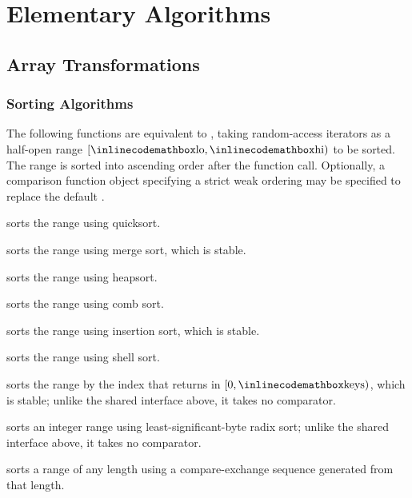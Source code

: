\chapter{\texorpdfstring{Elementary Algorithms}{1. Elementary Algorithms}}

\section{\texorpdfstring{Array Transformations}{1.1 Array Transformations}}
\setcounter{section}{1}
\setcounter{subsection}{0}
\subsection{Sorting Algorithms}
\label{sec:1.1.1}
The following functions are equivalent to , taking random-access iterators as a half-open range $[{\inlinecodemath{lo}}, {\inlinecodemath{hi}})$ to be sorted. The range is sorted into ascending order after the function call. Optionally, a comparison function object specifying a strict weak ordering may be specified to replace the default .

\begin{compactitem}
  \item {} sorts the range using quicksort.
  \item {} sorts the range using merge sort, which is stable.
  \item {} sorts the range using heapsort.
  \item {} sorts the range using comb sort.
  \item {} sorts the range using insertion sort, which is stable.
  \item {} sorts the range using shell sort.
  \item {} sorts the range by the index that  returns in $[0, {\inlinecodemath{keys}})$, which is stable; unlike the shared interface above, it takes no comparator.
  \item {} sorts an integer range using least-significant-byte radix sort; unlike the shared interface above, it takes no comparator.
  \item {} sorts a range of any length using a compare-exchange sequence generated from that length.
\end{compactitem}

